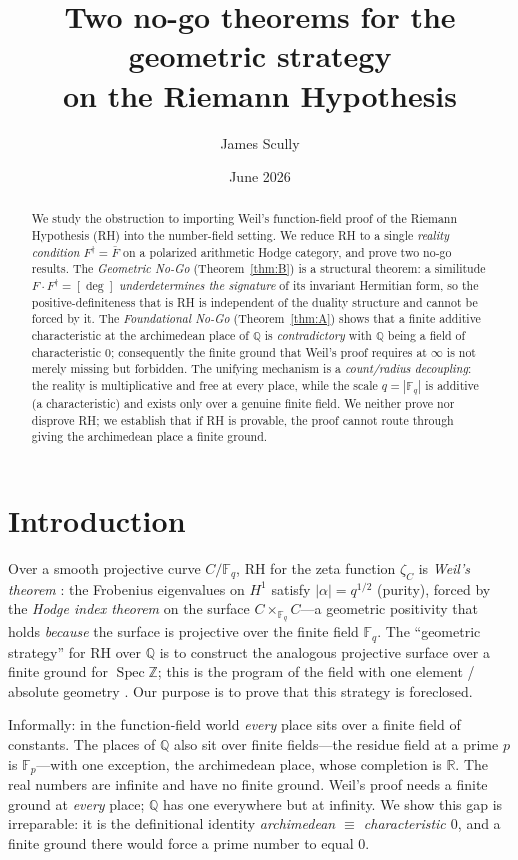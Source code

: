 \documentclass[11pt,reqno]{amsart}
\title[A characteristic-zero obstruction to a geometric proof of RH]{Two no-go theorems for the geometric strategy\\ on the Riemann Hypothesis}
\author{James Scully}
\date{June 2026}
\theoremstyle{plain}
\theoremstyle{definition}
\theoremstyle{remark}
\newcommand{\Q}{\mathbb{Q}}
\newcommand{\R}{\mathbb{R}}
\newcommand{\Z}{\mathbb{Z}}
\newcommand{\F}{\mathbb{F}}
\newcommand{\dg}{^{\dagger}}
\newcommand{\Spec}{\operatorname{Spec}}
\begin{document}
\begin{abstract}
We study the obstruction to importing Weil's function-field proof of the Riemann Hypothesis (RH) into the
number-field setting. We reduce RH to a single \emph{reality condition} $F\dg=\bar F$ on a polarized
arithmetic Hodge category, and prove two no-go results. The \emph{Geometric No-Go} (Theorem~\ref{thm:B}) is
a structural theorem: a similitude $F\cdot F\dg=[\deg]$ \emph{underdetermines the signature} of its invariant
Hermitian form, so the positive-definiteness that is RH is independent of the duality structure and cannot be
forced by it. The \emph{Foundational No-Go} (Theorem~\ref{thm:A}) shows that a finite additive characteristic
at the archimedean place of $\Q$ is \emph{contradictory} with $\Q$ being a field of characteristic $0$;
consequently the finite ground that Weil's proof requires at $\infty$ is not merely missing but forbidden.
The unifying mechanism is a \emph{count/radius decoupling}: the reality is multiplicative and free at every
place, while the scale $q=|\F_q|$ is additive (a characteristic) and exists only over a genuine finite field.
We neither prove nor disprove RH; we establish that if RH is provable, the proof cannot route through giving
the archimedean place a finite ground.
\end{abstract}

\maketitle

\section{Introduction}\label{sec:intro}

Over a smooth projective curve $C/\F_q$, RH for the zeta function $\zeta_C$ is \emph{Weil's theorem}
\cite{Weil}: the Frobenius eigenvalues on $H^1$ satisfy $|\alpha|=q^{1/2}$ (purity), forced by the
\emph{Hodge index theorem} on the surface $C\times_{\F_q}C$---a geometric positivity that holds
\emph{because} the surface is projective over the finite field $\F_q$. The ``geometric strategy'' for RH over
$\Q$ is to construct the analogous projective surface over a finite ground for $\Spec\Z$; this is the program
of the field with one element / absolute geometry \cite{Soule,Deitmar,Borger,ConnesConsaniF1}. Our purpose is
to prove that this strategy is foreclosed.

Informally: in the function-field world \emph{every} place sits over a finite field of constants. The places
of $\Q$ also sit over finite fields---the residue field at a prime $p$ is $\F_p$---with one exception, the
archimedean place, whose completion is $\R$. The real numbers are infinite and have no finite ground. Weil's
proof needs a finite ground at \emph{every} place; $\Q$ has one everywhere but at infinity. We show this gap
is irreparable: it is the definitional identity \emph{archimedean $\equiv$ characteristic $0$}, and a finite
ground there would force a prime number to equal $0$.
\end{document}
